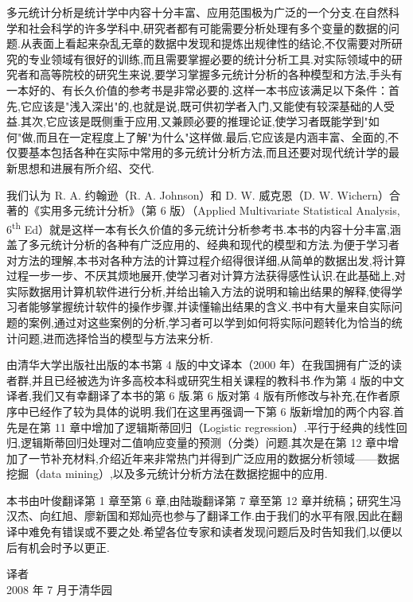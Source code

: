 \noindent 多元统计分析是统计学中内容十分丰富、应用范围极为广泛的一个分支.在自然科学和社会科学的许多学科中,研究者都有可能需要分析处理有多个变量的数据的问题.从表面上看起来杂乱无章的数据中发现和提炼出规律性的结论,不仅需要对所研究的专业领域有很好的训练,而且需要掌握必要的统计分析工具.对实际领域中的研究者和高等院校的研究生来说,要学习掌握多元统计分析的各种模型和方法,手头有一本好的、有长久价值的参考书是非常必要的.这样一本书应该满足以下条件：首先,它应该是"浅入深出"的,也就是说,既可供初学者入门,又能使有较深基础的人受益.其次,它应该是既侧重于应用,又兼顾必要的推理论证,使学习者既能学到"如何"做,而且在一定程度上了解"为什么"这样做.最后,它应该是内涵丰富、全面的,不仅要基本包括各种在实际中常用的多元统计分析方法,而且还要对现代统计学的最新思想和进展有所介绍、交代.

\noindent 我们认为 R. A. 约翰逊（R. A. Johnson）和 D. W. 威克恩（D. W. Wichern）合著的《实用多元统计分析》（第 6 版）（Applied Multivariate Statistical Analysis, 6\textsuperscript{th} Ed）就是这样一本有长久价值的多元统计分析参考书.本书的内容十分丰富,涵盖了多元统计分析的各种有广泛应用的、经典和现代的模型和方法.为便于学习者对方法的理解,本书对各种方法的计算过程介绍得很详细,从简单的数据出发,将计算过程一步一步、不厌其烦地展开,使学习者对计算方法获得感性认识.在此基础上,对实际数据用计算机软件进行分析,并给出输入方法的说明和输出结果的解释,使得学习者能够掌握统计软件的操作步骤,并读懂输出结果的含义.书中有大量来自实际问题的案例,通过对这些案例的分析,学习者可以学到如何将实际问题转化为恰当的统计问题,进而选择恰当的模型与方法来分析.

\noindent 由清华大学出版社出版的本书第 4 版的中文译本（2000 年）在我国拥有广泛的读者群,并且已经被选为许多高校本科或研究生相关课程的教科书.作为第 4 版的中文译者,我们又有幸翻译了本书的第 6 版.第 6 版对第 4 版有所修改与补充,在作者原序中已经作了较为具体的说明.我们在这里再强调一下第 6 版新增加的两个内容.首先是在第 11 章中增加了逻辑斯蒂回归（Logistic regression）.平行于经典的线性回归,逻辑斯蒂回归处理对二值响应变量的预测（分类）问题.其次是在第 12 章中增加了一节补充材料,介绍近年来非常热门并得到广泛应用的数据分析领域——数据挖掘（data mining）,以及多元统计分析方法在数据挖掘中的应用.

\noindent 本书由叶俊翻译第 1 章至第 6 章,由陆璇翻译第 7 章至第 12 章并统稿；研究生冯汉杰、向红旭、廖新国和郑灿亮也参与了翻译工作.由于我们的水平有限,因此在翻译中难免有错误或不要之处.希望各位专家和读者发现问题后及时告知我们,以便以后有机会时予以更正.

\vspace{10pt}
\begin{flushright}
译\quad 者\\
2008 年 7 月于清华园
\end{flushright}

